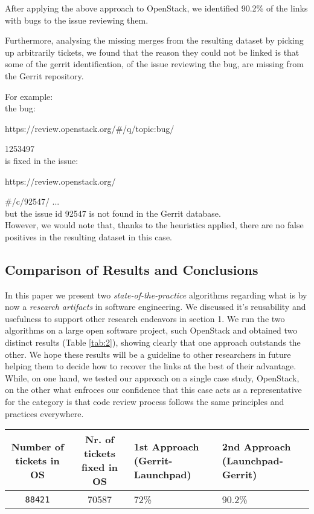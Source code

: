 \documentclass{sig-alternate-05-2015}
\begin{document}
After applying the above approach to OpenStack, we identified 90.2\% of the links with bugs to the issue reviewing them. 

Furthermore, analysing the missing merges from the resulting dataset by picking up arbitrarily tickets, we found that 
the reason they could not be linked is 
that some of the gerrit identification, of the issue reviewing the bug, are missing from the 
Gerrit repository.

For example: 
\\

the bug:

https://review.openstack.org/\#/q/topic:bug/

1253497 
\\

is fixed in the issue:

https://review.openstack.org/

\#/c/92547/ ...
\\

but the issue id 92547 is not found in the Gerrit database.
\\

However, we would note that, thanks to the heuristics applied, there are no false positives in the 
resulting dataset in this case. 

\subsection{Comparison of Results and Conclusions}
In this paper we present two \emph{state-of-the-practice} algorithms regarding what is by now 
a \emph{research artifacts} in software engineering. 
We discussed it's reusability and usefulness to support other research endeavors in section 1. 
We run the two algorithms on a large open software project, such OpenStack and obtained two distinct results 
(Table \ref{tab:2}), showing 
clearly that one approach outstands the other.
We hope these results will be a guideline to other researchers in future helping them to decide how to 
recover the links at the best of their advantage. While, on one hand, we tested our approach on a single case study, 
OpenStack, on the other what enfroces our confidence that this case acts as a representative for the category is 
that code review process follows the same principles and practices everywhere. 

\begin{table*}
\centering
\caption{The results of the two state-of-the practice algorithms applied on OpenStack (OS) history from July 2010 - January 2016.}
\begin{tabular}{|c|c|l|l|} \hline
Number of tickets in OS&Nr. of tickets fixed in OS&1st Approach (Gerrit-Launchpad)&2nd Approach (Launchpad-Gerrit)\\ \hline
\texttt{88421} & 70587& 72\%& 90.2\%\\ \hline

\end{tabular}
\label{tab:2}
\end{table*}
\end{document}
